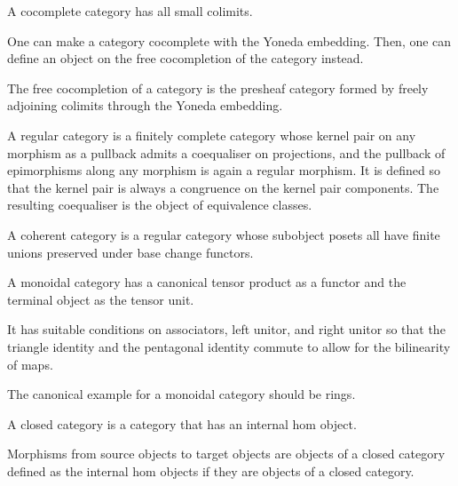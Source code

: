 \begin{definition}
    \label{definition-cocomplete}
    A cocomplete category has all small colimits.
\end{definition}

One can make a category cocomplete with the Yoneda embedding.
Then, one can define an object on the free cocompletion of the category instead.

\begin{definition}
    \label{definition-free-cocompletion}
    The free cocompletion of a category is the presheaf category formed by freely adjoining colimits through the Yoneda embedding.
\end{definition}

\begin{definition}
    \label{definition-regular-category}
    A regular category is a finitely complete category whose kernel pair on any morphism as a pullback admits a coequaliser on projections, and the pullback of epimorphisms along any morphism is again a regular morphism. It is defined so that the kernel pair is always a congruence on the kernel pair components. The resulting coequaliser is the object of equivalence classes.
\end{definition}

\begin{definition}
    \label{definition-coherent-category}
    A coherent category is a regular category whose subobject posets all have finite unions preserved under base change functors.
\end{definition}

\begin{definition}
    \label{definition-monoidal-category}
    A monoidal category has a canonical tensor product as a functor and the terminal object as the tensor unit. 
    
    It has suitable conditions on associators, left unitor, and right unitor so that the triangle identity and the pentagonal identity commute to allow for the bilinearity of maps.
\end{definition}

The canonical example for a monoidal category should be rings.

\begin{definition}
    \label{definition-closed-category}
    A closed category is a category that has an internal hom object. 
    
    Morphisms from source objects to target objects are objects of a closed category defined as the internal hom objects if they are objects of a closed category.
\end{definition}

